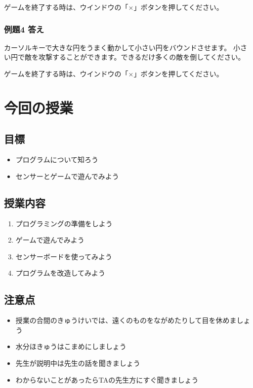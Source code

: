 ゲームを終了する時は、ウインドウの「×」ボタンを押してください。

\subsubsection*{例題4 答え}

カーソルキーで大きな円をうまく動かして小さい円をバウンドさせます。
小さい円で敵を攻撃することができます。できるだけ多くの敵を倒してください。

ゲームを終了する時は、ウインドウの「×」ボタンを押してください。











\clearpage
\section{今回の授業}
\subsection{目標}
\begin{itemize}
  \item プログラムについて知ろう
  \item センサーとゲームで遊んでみよう
\end{itemize}

\subsection{授業内容}
\begin{enumerate}
  \item プログラミングの準備をしよう
  \item ゲームで遊んでみよう
  \item センサーボードを使ってみよう
  \item プログラムを改造してみよう
\end{enumerate}

\subsection{注意点}
\begin{itemize}
  \item 授業の合間のきゅうけいでは、遠くのものをながめたりして目を休めましょう
  \item 水分ほきゅうはこまめにしましょう
  \item 先生が説明中は先生の話を聞きましょう
  \item わからないことがあったらTAの先生方にすぐ聞きましょう
\end{itemize}

